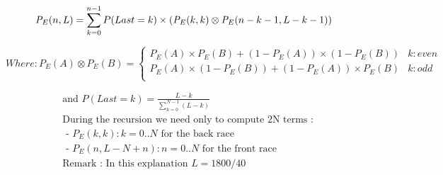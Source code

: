 \documentclass[10pt,a4paper]{letter}
\begin{document}
$$  \textit{P}_{E}(n,L) =\sum_{k=0}^{n-1}P(Last=k)\times(\textit{P}_{E}(k,k)\otimes\textit{P}_{E}(n-k-1,L-k-1))\\
$$

$$
Where:\textit{P}_{E}(A)\otimes\textit{P}_{E}(B) = \begin{cases}
\textit{P}_{E}(A)\times\textit{P}_{E}(B)+(1-\textit{P}_{E}(A))\times(1-\textit{P}_{E}(B)) 
& k:even\\
\textit{P}_{E}(A)\times(1-\textit{P}_{E}(B))+(1-\textit{P}_{E}(A))\times\textit{P}_{E}(B) 
& k:odd\\ 
\end{cases}
$$

\begin{align*}
& \text{and }P(Last=k)=\frac{L-k}{\sum_{k=0}^{N-1}(L-k)}\\
& \text{During the recursion we need only to compute 2N terms :}\\
& \textit{    - P}_{E}(k,k):k=0..N \text{ for the back race}\\
& \textit{    - P}_{E}(n,L-N+n):n=0..N \text{ for the front race}\\
& \text{Remark : In this explanation }L=1800/40	
\end{align*}
\end{document}

